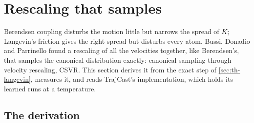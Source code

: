 \section{Rescaling that samples}
\label{sec:th-csvr}

Berendsen coupling disturbs the motion little but narrows the spread of
$K$; Langevin's friction gives the right spread but disturbs every atom.
Bussi, Donadio and Parrinello found a rescaling of all the velocities
together, like Berendsen's, that samples the canonical distribution
exactly\cite{Bussi2007}: canonical sampling through velocity rescaling,
CSVR. This section derives it from the exact step of
\cref{sec:th-langevin}, measures it, and reads TrajCast's implementation,
which holds its learned runs at a temperature.

\subsection*{The derivation}


